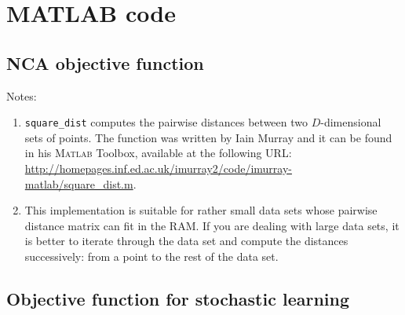 \chapter{MATLAB code}

\section{NCA objective function}
\label{app:code-nca-obj}
{\singlespace \small

}

Notes: 
\begin{enumerate}
  \item \texttt{square\_dist} computes the pairwise distances between two $D$-dimensional sets of points. The function was written by Iain Murray and it can be found in his \textsc{Matlab} Toolbox, available at the following URL: \protect\url{http://homepages.inf.ed.ac.uk/imurray2/code/imurray-matlab/square_dist.m}.
  \item This implementation is suitable for rather small data sets whose pairwise distance matrix can fit in the RAM. If you are dealing with large data sets, it is better to iterate through the data set and compute the distances successively: from a point to the rest of the data set. 
\end{enumerate}

\section{Objective function for stochastic learning}
\label{app:code-snca-obj}
{\singlespace \small

}
